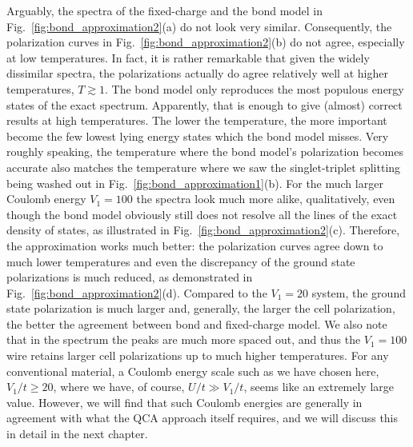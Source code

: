 Arguably, the spectra of the fixed-charge and the bond model in
Fig.~\ref{fig:bond_approximation2}(a) do not look very similar. Consequently,
the polarization curves in Fig.~\ref{fig:bond_approximation2}(b) do not agree,
especially at low temperatures. In fact, it is rather remarkable that given the
widely dissimilar spectra, the polarizations actually do agree relatively well
at higher temperatures, $T \gtrsim 1$. The bond model only reproduces the most
populous energy states of the exact spectrum. Apparently, that is enough to give
(almost) correct results at high temperatures. The lower the temperature, the
more important become the few lowest lying energy states which the bond model
misses. Very roughly speaking, the temperature where the bond model's
polarization becomes accurate also matches the temperature where we saw the
singlet-triplet splitting being washed out in
Fig.~\ref{fig:bond_approximation1}(b). For the much larger Coulomb energy $V_1 =
100$ the spectra look much more alike, qualitatively, even though the bond model
obviously still does not resolve all the lines of the exact density of states,
as illustrated in Fig.~\ref{fig:bond_approximation2}(c). Therefore, the
approximation works much better: the polarization curves agree down to much
lower temperatures and even the discrepancy of the ground state polarizations is
much reduced, as demonstrated in Fig.~\ref{fig:bond_approximation2}(d).
Compared to the $V_1 = 20$ system, the ground state polarization is much larger
and, generally, the larger the cell polarization, the better the agreement
between bond and fixed-charge model. We also note that in the spectrum the peaks
are much more spaced out, and thus the $V_1 = 100$ wire retains larger cell
polarizations up to much higher temperatures. For any conventional material, a
Coulomb energy scale such as we have chosen here, $V_1/t \ge 20$, where we have,
of course, $U/t \gg V_1/t$, seems like an extremely large value. However, we
will find that such Coulomb energies are generally in agreement with what the
QCA approach itself requires, and we will discuss this in detail in the next
chapter.

